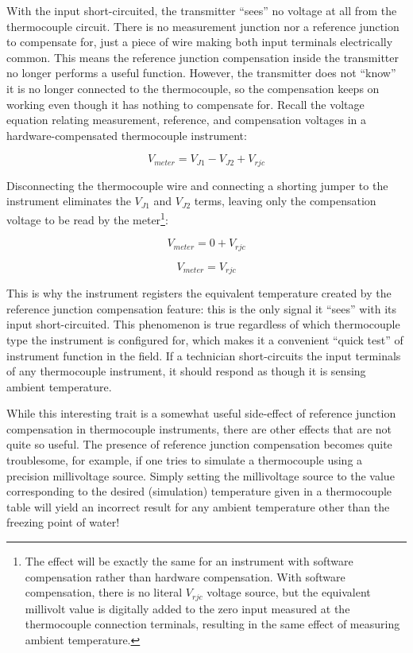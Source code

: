 With the input short-circuited, the transmitter ``sees'' no voltage at all from the thermocouple circuit.  There is no measurement junction nor a reference junction to compensate for, just a piece of wire making both input terminals electrically common.  This means the reference junction compensation inside the transmitter no longer performs a useful function.  However, the transmitter does not ``know'' it is no longer connected to the thermocouple, so the compensation keeps on working even though it has nothing to compensate for.  Recall the voltage equation relating measurement, reference, and compensation voltages in a hardware-compensated thermocouple instrument:

$$V_{meter} = V_{J1} - V_{J2} + V_{rjc}$$

Disconnecting the thermocouple wire and connecting a shorting jumper to the instrument eliminates the $V_{J1}$ and $V_{J2}$ terms, leaving only the compensation voltage to be read by the meter\footnote{The effect will be exactly the same for an instrument with software compensation rather than hardware compensation.  With software compensation, there is no literal $V_{rjc}$ voltage source, but the equivalent millivolt value is digitally added to the zero input measured at the thermocouple connection terminals, resulting in the same effect of measuring ambient temperature.}:

$$V_{meter} = 0 + V_{rjc}$$

$$V_{meter} = V_{rjc}$$

\filbreak

This is why the instrument registers the equivalent temperature created by the reference junction compensation feature: this is the only signal it ``sees'' with its input short-circuited.  This phenomenon is true regardless of which thermocouple type the instrument is configured for, which makes it a convenient ``quick test'' of instrument function in the field.  If a technician short-circuits the input terminals of any thermocouple instrument, it should respond as though it is sensing ambient temperature.

\vskip 10pt

While this interesting trait is a somewhat useful side-effect of reference junction compensation in thermocouple instruments, there are other effects that are not quite so useful.  The presence of reference junction compensation becomes quite troublesome, for example, if one tries to simulate a thermocouple using a precision millivoltage source.  Simply setting the millivoltage source to the value corresponding to the desired (simulation) temperature given in a thermocouple table will yield an incorrect result for any ambient temperature other than the freezing point of water!

